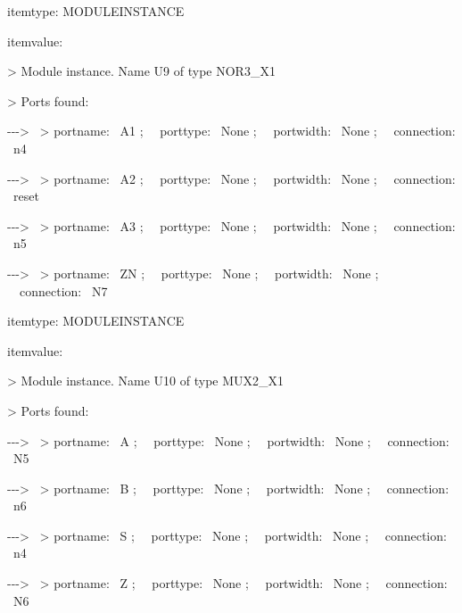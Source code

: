 \documentclass[a4paper]{article}
\begin{document}
\begin{center}
\begin{minipage}{5.98958in}
\bigskip

{\ttfamily\color[rgb]{0.0,0.0,0.039215688}
itemtype: MODULEINSTANCE}

{\ttfamily\color[rgb]{0.0,0.0,0.039215688}
itemvalue:}

{\ttfamily\color[rgb]{0.0,0.0,0.039215688}
{\textgreater} Module instance. Name U9 of type NOR3\_X1}

{\ttfamily\color[rgb]{0.0,0.0,0.039215688}
{\textgreater} Ports found:}

{\ttfamily\color[rgb]{0.0,0.0,0.039215688}
{}-{}-{}-{\textgreater} \ {\textgreater} portname: \ A1 ; \ \ porttype:
\ None ; \ \ portwidth: \ None ; \ \ connection: \ n4}

{\ttfamily\color[rgb]{0.0,0.0,0.039215688}
{}-{}-{}-{\textgreater} \ {\textgreater} portname: \ A2 ; \ \ porttype:
\ None ; \ \ portwidth: \ None ; \ \ connection: \ reset}

{\ttfamily\color[rgb]{0.0,0.0,0.039215688}
{}-{}-{}-{\textgreater} \ {\textgreater} portname: \ A3 ; \ \ porttype:
\ None ; \ \ portwidth: \ None ; \ \ connection: \ n5}

{\ttfamily\color[rgb]{0.0,0.0,0.039215688}
{}-{}-{}-{\textgreater} \ {\textgreater} portname: \ ZN ; \ \ porttype:
\ None ; \ \ portwidth: \ None ; \ \ connection: \ N7}

{\ttfamily\color[rgb]{0.0,0.0,0.039215688}
itemtype: MODULEINSTANCE}

{\ttfamily\color[rgb]{0.0,0.0,0.039215688}
itemvalue:}

{\ttfamily\color[rgb]{0.0,0.0,0.039215688}
{\textgreater} Module instance. Name U10 of type MUX2\_X1}

{\ttfamily\color[rgb]{0.0,0.0,0.039215688}
{\textgreater} Ports found:}

{\ttfamily\color[rgb]{0.0,0.0,0.039215688}
{}-{}-{}-{\textgreater} \ {\textgreater} portname: \ A ; \ \ porttype:
\ None ; \ \ portwidth: \ None ; \ \ connection: \ N5}

{\ttfamily\color[rgb]{0.0,0.0,0.039215688}
{}-{}-{}-{\textgreater} \ {\textgreater} portname: \ B ; \ \ porttype:
\ None ; \ \ portwidth: \ None ; \ \ connection: \ n6}

{\ttfamily\color[rgb]{0.0,0.0,0.039215688}
{}-{}-{}-{\textgreater} \ {\textgreater} portname: \ S ; \ \ porttype:
\ None ; \ \ portwidth: \ None ; \ \ connection: \ n4}

{\ttfamily\color[rgb]{0.0,0.0,0.039215688}
{}-{}-{}-{\textgreater} \ {\textgreater} portname: \ Z ; \ \ porttype:
\ None ; \ \ portwidth: \ None ; \ \ connection: \ N6}


\bigskip
\end{minipage}
\end{center}
\end{document}
